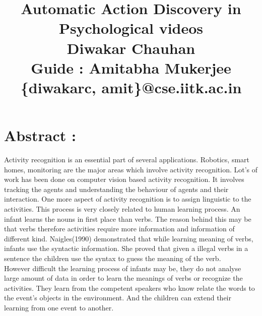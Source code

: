 \documentclass[11pt, twocolumn]{article}
\begin{document}
\title{{\bf Automatic Action Discovery in Psychological videos}\\ \vspace{10pt}
			 { \normalsize {Diwakar Chauhan \\ Guide : Amitabha Mukerjee \\ \{diwakarc, amit\}@cse.iitk.ac.in}}}
\maketitle

\section*{Abstract :}
Activity recognition is an essential part of several applications. Robotics, smart homes, monitoring are the major areas which involve activity recognition. Lot's of work has been done on computer vision based activity recognition. It involves tracking the agents and understanding the behaviour of agents and their interaction. One more aspect of activity recognition is to assign linguistic to the activities. This process is very closely  related to human learning process. An infant learns the nouns in first place than verbs. The reason behind this may be that verbs therefore activities require more information and information of different kind. Naigles(1990)\cite{naigles} demonstrated that while learning meaning of verbs, infants use the syntactic information. She proved that given a illegal verbs in a sentence the children use the syntax to guess the meaning of the verb. \\
\hspace*{10pt} However difficult the learning process of infants may be, they do not analyse large amount of data in order to learn the meanings of verbs or recognize the activities. They learn from the competent speakers who know relate the words to the event's objects in the environment.\cite{kerr-cohen-08_wubble-world-lang-acquisition} And the children can extend their learning from one event to another. 
\end{document}
